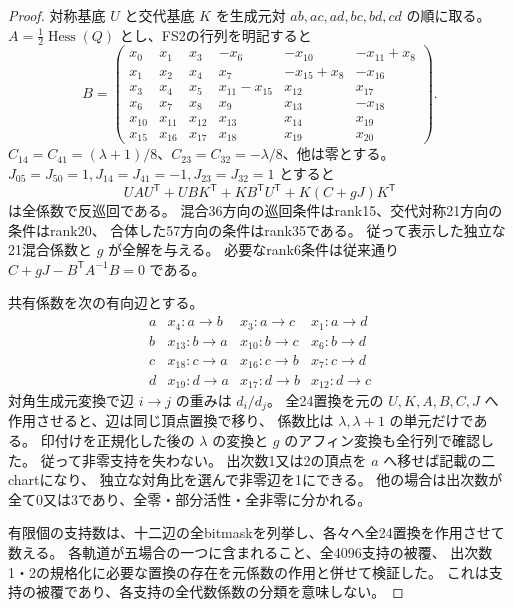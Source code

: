 \begin{proof}
対称基底 $U$ と交代基底 $K$ を生成元対 $ab,ac,ad,bc,bd,cd$ の順に取る。
$A=\tfrac12\operatorname{Hess}(Q)$ とし、FS2の行列を明記すると
\[
 B=\begin{pmatrix}
 x_0&x_1&x_3&-x_6&-x_{10}&-x_{11}+x_8\\
 x_1&x_2&x_4&x_7&-x_{15}+x_8&-x_{16}\\
 x_3&x_4&x_5&x_{11}-x_{15}&x_{12}&x_{17}\\
 x_6&x_7&x_8&x_9&x_{13}&-x_{18}\\
 x_{10}&x_{11}&x_{12}&x_{13}&x_{14}&x_{19}\\
 x_{15}&x_{16}&x_{17}&x_{18}&x_{19}&x_{20}
 \end{pmatrix}.
\]
$C_{14}=C_{41}=(\lambda+1)/8$、$C_{23}=C_{32}=-\lambda/8$、他は零とする。
$J_{05}=J_{50}=1,J_{14}=J_{41}=-1,J_{23}=J_{32}=1$ とすると
\[
 UAU^{\mathsf T}+UBK^{\mathsf T}+KB^{\mathsf T}U^{\mathsf T}
       +K(C+gJ)K^{\mathsf T}
\]
は全係数で反巡回である。
混合36方向の巡回条件はrank15、交代対称21方向の条件はrank20、
合体した57方向の条件はrank35である。
従って表示した独立な21混合係数と $g$ が全解を与える。
必要なrank6条件は従来通り $C+gJ-B^{\mathsf T}A^{-1}B=0$ である。

共有係数を次の有向辺とする。
\[
\begin{array}{c|ccc}
 a&x_4:a\to b&x_3:a\to c&x_1:a\to d\\
 b&x_{13}:b\to a&x_{10}:b\to c&x_6:b\to d\\
 c&x_{18}:c\to a&x_{16}:c\to b&x_7:c\to d\\
 d&x_{19}:d\to a&x_{17}:d\to b&x_{12}:d\to c
\end{array}
\]
対角生成元変換で辺 $i\to j$ の重みは $d_i/d_j$。
全24置換を元の $U,K,A,B,C,J$ へ作用させると、辺は同じ頂点置換で移り、
係数比は $\lambda,\lambda+1$ の単元だけである。
印付けを正規化した後の $\lambda$ の変換と $g$ のアフィン変換も全行列で確認した。
従って非零支持を失わない。
出次数1又は2の頂点を $a$ へ移せば記載の二chartになり、
独立な対角比を選んで非零辺を1にできる。
他の場合は出次数が全て0又は3であり、全零・部分活性・全非零に分かれる。

有限個の支持数は、十二辺の全bitmaskを列挙し、各々へ全24置換を作用させて数える。
各軌道が五場合の一つに含まれること、全4096支持の被覆、
出次数1・2の規格化に必要な置換の存在を元係数の作用と併せて検証した。
これは支持の被覆であり、各支持の全代数係数の分類を意味しない。
\end{proof}

